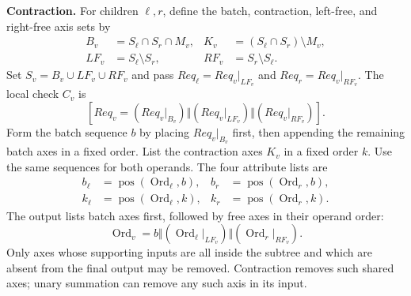 \noindent\textbf{Contraction.}
For children $\ell,r$, define the batch, contraction, left-free, and
right-free axis sets by
\begin{equation}
\begin{aligned}
 B_v&=S_\ell\cap S_r\cap M_v,&
 K_v&=(S_\ell\cap S_r)\setminus M_v,\\
 LF_v&=S_\ell\setminus S_r,&
 RF_v&=S_r\setminus S_\ell.
\end{aligned}
\label{eq:canonical-roles}
\end{equation}
Set $S_v=B_v\cup LF_v\cup RF_v$ and pass
$Req_\ell=Req_v|_{LF_v}$ and $Req_r=Req_v|_{RF_v}$.
The local check $C_v$ is
\begin{equation}
 \left[Req_v=(Req_v|_{B_v})\Vert(Req_v|_{LF_v})\Vert(Req_v|_{RF_v})\right].
 \label{eq:block-order}
\end{equation}
Form the batch sequence $b$ by placing $Req_v|_{B_v}$ first, then appending
the remaining batch axes in a fixed order. List the contraction axes
$K_v$ in a fixed order $k$. Use the same sequences for both operands.
The four attribute lists are
\begin{equation}
\begin{aligned}
 b_\ell&=\operatorname{pos}(\operatorname{Ord}_\ell,b),&
 b_r&=\operatorname{pos}(\operatorname{Ord}_r,b),\\
 k_\ell&=\operatorname{pos}(\operatorname{Ord}_\ell,k),&
 k_r&=\operatorname{pos}(\operatorname{Ord}_r,k).
\end{aligned}
\label{eq:formal-attributes}
\end{equation}
The output lists batch axes first, followed by free axes in their operand
order:
\begin{equation}
 \operatorname{Ord}_v=b\Vert
 (\operatorname{Ord}_\ell|_{LF_v})\Vert
 (\operatorname{Ord}_r|_{RF_v}).
 \label{eq:constructed-order}
\end{equation}
Only axes whose supporting inputs are all inside the subtree and which
are absent from the final output may be removed. Contraction removes
such shared axes; unary summation can remove any such axis in its input.

